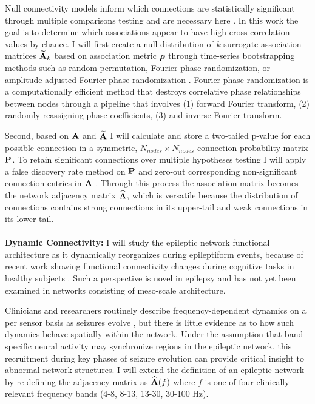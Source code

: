 Null connectivity models inform which connections are statistically significant through multiple comparisons testing and are necessary here \cite{bassett2013robust}. In this work the goal is to determine which associations appear to have high cross-correlation values by chance. I will first create a null distribution of $k$ surrogate association matrices $\widetilde{\mathbf{\displaystyle A}}_k$ based on association metric $\boldsymbol{\displaystyle \rho}$ through time-series bootstrapping methods such as random permutation, Fourier phase randomization, or amplitude-adjusted Fourier phase randomization \cite{bassett2013robust}. Fourier phase randomization is a computationally efficient method that destroys correlative phase relationships between nodes through a pipeline that involves (1) forward Fourier transform, (2) randomly reassigning phase coefficients, (3) and inverse Fourier transform.

Second, based on $\mathbf{\displaystyle A}$ and $\widetilde{\mathbf{\displaystyle A}}$ I will calculate and store a two-tailed p-value for each possible connection in a symmetric, $N_{nodes} \times N_{nodes}$ connection probability matrix $\mathbf{\displaystyle P}$. To retain significant connections over multiple hypotheses testing I will apply a false discovery rate method on $\mathbf{\displaystyle P}$ and zero-out corresponding non-significant connection entries in $\mathbf{\displaystyle A}$ \cite{benjamini2001control}. Through this process the association matrix becomes the network adjacency matrix $\widehat{\mathbf{\displaystyle A}}$, which is versatile because the distribution of connections contains strong connections in its upper-tail and weak connections in its lower-tail.
~\\
~\\
\textbf{Dynamic Connectivity:}
I will study the epileptic network functional architecture as it dynamically reorganizes during epileptiform events, because of recent work showing functional connectivity changes during cognitive tasks in healthy subjects \cite{bassett2011dynamic}. Such a perspective is novel in epilepsy and has not yet been examined in networks consisting of meso-scale architecture.

Clinicians and researchers routinely describe frequency-dependent dynamics on a per sensor basis as seizures evolve \cite{franaszczuk1998timefrequency, tzallas2009epileptic}, but there is little evidence as to how such dynamics behave spatially within the network. Under the assumption that band-specific neural activity may synchronize regions in the epileptic network, this recruitment during key phases of seizure evolution can provide critical insight to abnormal network structures. I will extend the definition of an epileptic network by re-defining the adjacency matrix as $\widehat{\mathbf{\displaystyle A}}(f)$ where $f$ is one of four clinically-relevant frequency bands (4-8, 8-13, 13-30, 30-100 Hz).

